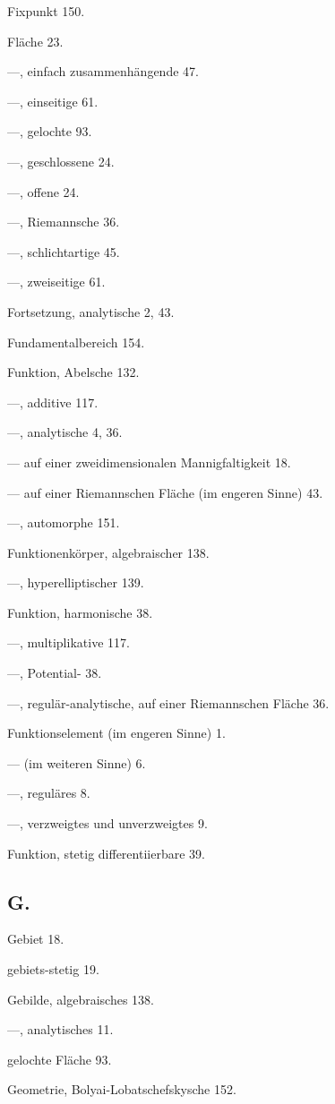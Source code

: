 \documentclass{article}
\begin{document}
Fixpunkt 150.

Fläche 23.

---, einfach zusammenhängende 47.

---, einseitige 61.

---, gelochte 93.

---, geschlossene 24.

---, offene 24.

---, Riemannsche 36.

---, schlichtartige 45.

---, zweiseitige 61.

Fortsetzung, analytische 2, 43.

Fundamentalbereich 154.

Funktion, Abelsche 132.

---, additive 117.

---, analytische 4, 36.

--- auf einer zweidimensionalen Mannigfaltigkeit 18.

--- auf einer Riemannschen Fläche (im engeren Sinne) 43.

---, automorphe 151.

Funktionenkörper, algebraischer 138.

---, hyperelliptischer 139.

Funktion, harmonische 38.

---, multiplikative 117.

---, Potential- 38.

---, regulär-analytische, auf einer Riemannschen Fläche 36.

Funktionselement (im engeren Sinne) 1.

--- (im weiteren Sinne) 6.

---, reguläres 8.

---, verzweigtes und unverzweigtes 9.

Funktion, stetig differentiierbare 39.

\subsection*{G.}

Gebiet 18.

gebiets-stetig 19.

Gebilde, algebraisches 138.

---, analytisches 11.

gelochte Fläche 93.

Geometrie, Bolyai-Lobatschefskysche 152.
\end{document}
